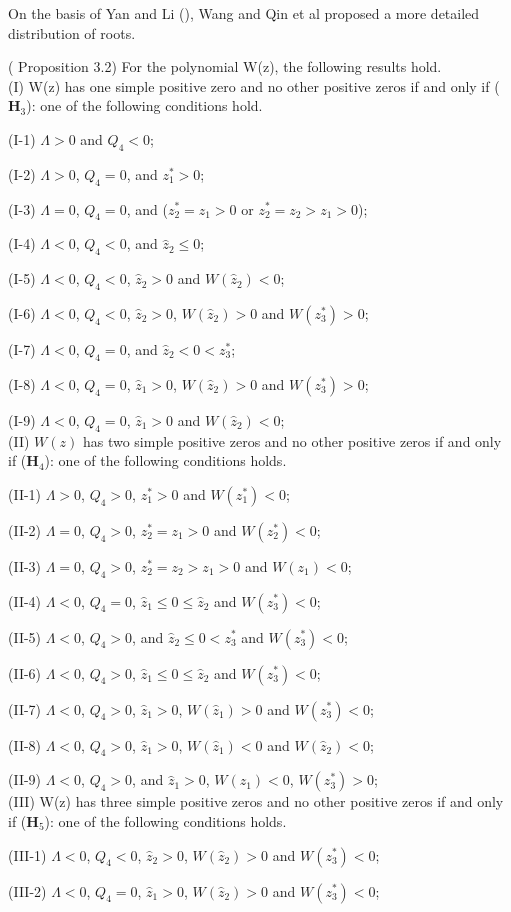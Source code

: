 \documentclass{CMHPhD-SIVD}
\begin{document}
On the basis of Yan and Li (\cite{yan2006stability}), Wang and Qin et al \cite{wang2019hopf} proposed a more detailed distribution of roots.


\begin{lemma}\label{3.2} (\cite{wang2019hopf} Proposition 3.2) For the polynomial W(z), the following results hold.\\
(I) W(z) has one simple positive zero and no other positive zeros if and only if ($\mathbf{H}_3$): one of the
following conditions hold.

(I-1) $\Lambda>0$ and $Q_4<0$;

(I-2) $\Lambda>0$, $Q_4=0$, and $z_1^*>0$;

(I-3) $\Lambda=0$, $Q_4=0$, and ($z_2^*=z_1>0$ or $z_2^*=z_2>z_1>0$);

(I-4) $\Lambda<0$, $Q_4<0$, and $\hat{z}_2\leq0$;

(I-5) $\Lambda<0$, $Q_4<0$, $\hat{z}_2>0$ and $W(\hat{z}_2)<0$;

(I-6) $\Lambda<0$, $Q_4<0$, $\hat{z}_2>0$, $W(\hat{z}_2)>0$ and $W(z_3^*)>0$;

(I-7) $\Lambda<0$, $Q_4=0$, and $\hat{z}_2<0<z_3^*$;

(I-8) $\Lambda<0$, $Q_4=0$, $\hat{z}_1>0$, $W(\hat{z}_2)>0$ and $W(z_3^*)>0$;

(I-9) $\Lambda<0$, $Q_4=0$, $\hat{z}_1>0$ and $W(\hat{z}_2)<0$;\\
(II) $W(z)$ has two simple positive zeros and no other positive zeros if and only if ($\mathbf{H}_4$): one of the
following conditions holds.

(II-1) $\Lambda>0$, $Q_4>0$, $z_1^*>0$ and $W(z_1^*)<0$;

(II-2) $\Lambda=0$, $Q_4>0$, $z_2^*=z_1>0$ and $W(z_2^*)<0$;

(II-3) $\Lambda=0$, $Q_4>0$, $z_2^*=z_2>z_1>0$ and $W(z_1)<0$;

(II-4) $\Lambda<0$, $Q_4=0$, $\hat{z}_1\leq0\leq\hat{z}_2$ and $W(z_3^*)<0$;

(II-5) $\Lambda<0$, $Q_4>0$, and $\hat{z}_2\leq0<z_3^*$ and $W(z_3^*)<0$;

(II-6) $\Lambda<0$, $Q_4>0$,  $\hat{z}_1\leq0\leq\hat{z}_2$ and $W(z_3^*)<0$;

(II-7) $\Lambda<0$, $Q_4>0$, $\hat{z}_1>0$, $W(\hat{z}_1)>0$ and $W(z_3^*)<0$;

(II-8) $\Lambda<0$, $Q_4>0$, $\hat{z}_1>0$, $W(\hat{z}_1)<0$ and $W(\hat{z}_2)<0$;

(II-9) $\Lambda<0$, $Q_4>0$, and $\hat{z}_1>0$, $W(\hat{z}_1)<0$, $W(z_3^*)>0$;\\
(III) W(z) has three simple positive zeros and no other positive zeros if and only if ($\mathbf{H}_5$): one of the
following conditions holds.

(III-1) $\Lambda<0$, $Q_4<0$, $\hat{z}_2>0$, $W(\hat{z}_2)>0$ and $W(z_3^*)<0$;

(III-2) $\Lambda<0$, $Q_4=0$, $\hat{z}_1>0$, $W(\hat{z}_2)>0$ and $W(z_3^*)<0$;
\end{lemma}
\end{document}
